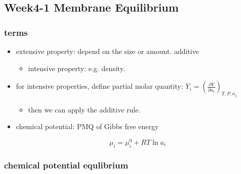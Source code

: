 \documentclass[]{article}
\begin{document}
\hypertarget{week4-1-membrane-equilibrium}{%
\subsection{Week4-1 Membrane
Equilibrium}\label{week4-1-membrane-equilibrium}}

\hypertarget{terms}{%
\subsubsection{terms}\label{terms}}

\begin{itemize}
\item
  extensive property: depend on the size or amount. additive

  \begin{itemize}
  \item
    intensive property: e.g. density. 
  \end{itemize}
\item
  for intensive properties, define partial molar quantity:
  \(\overline{Y_i}=\left(\frac{\partial Y}{\partial n_i}\right)_{T,P,n_j}\)

  \begin{itemize}
  \item
    then we can apply the additive rule.
  \end{itemize}
\item
  chemical potential: PMQ of Gibbs free energy

  \[\mu_i=\mu_i^0+RT\ln a_i\]
\end{itemize}

\hypertarget{chemical-potential-equlibrium}{%
\subsubsection{chemical potential
equlibrium}\label{chemical-potential-equlibrium}}
\end{document}
